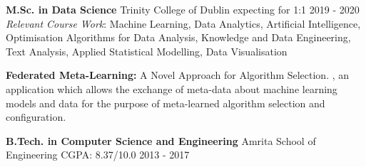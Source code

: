 \vspace{0.5ex}
\begin{cventries}
  \cventry
    {\textbf{M.Sc. in Data Science}}
    {Trinity College of Dublin}
    {expecting for 1:1}
    {2019 - 2020}
    {
        {\textit{Relevant Course Work}: Machine Learning, Data Analytics, Artificial Intelligence, Optimisation Algorithms for Data Analysis, Knowledge and Data Engineering, Text Analysis, Applied Statistical Modelling, Data Visualisation}
        {}
    }
    {\begin{cvskills}
        {\textbf{Federated Meta-Learning:} A Novel Approach for Algorithm Selection.}
        \cvskill{}
        {, an application which allows the exchange of meta-data about machine learning models and data for the purpose of meta-learned algorithm selection and configuration.}
    \end{cvskills}}
    {}

  \cventry
    {\textbf{B.Tech. in Computer Science and Engineering}}
    {Amrita School of Engineering}
    {CGPA: 8.37/10.0}
    {2013 - 2017}
    {}%
    \vspace{-2.5ex}
\end{cventries}
